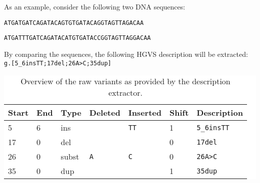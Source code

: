 \documentclass[final, slidestop]{beamer}
\begin{document}
\begin{frame}{}
\begin{myPoster}
{      \vspace{1cm}

      As an example, consider the following two DNA sequences:

      \vspace{1cm}

      \centerline{\texttt{ATGATGATCAGATACAGTGTGATACAGGTAGTTAGACAA}}
      \centerline{\texttt{ATGATTTGATCAGATACATGTGATACCGGTAGTTAGGACAA}}

      \vspace{1cm}

      By comparing the sequences, the following HGVS description will be
      extracted: \texttt{g.[5\_6insTT;17del;26A>C;35dup]}

      \vspace{1cm}

      \begin{table}
        \caption{Overview of the raw variants as provided by the description
          extractor.}
        \colorbox{white}{
        {\small
          \begin{tabular}{l|l|l|l|l|l|l}
            Start & End & Type  & Deleted    & Inserted    & Shift & Description \\
            \hline
            5     & 6   & ins   &            & \texttt{TT} & 1     & \texttt{5\_6insTT} \\
            17    & 0   & del   &            &             & 0     & \texttt{17del} \\
            26    & 0   & subst & \texttt{A} & \texttt{C}  & 0     & \texttt{26A>C} \\
            35    & 0   & dup   &            &             & 1     & \texttt{35dup} \\
          \end{tabular}
          }
        }
      \end{table}
    }
    \nextColumn
\end{myPoster}
\end{frame}
\end{document}
